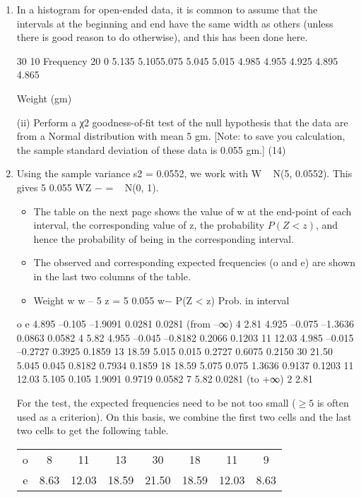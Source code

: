 \documentclass[a4paper,12pt]{article}
\begin{document}
\begin{enumerate} 
\item In a histogram for open-ended data, it is common to assume that the intervals at the beginning and end have the same width as others (unless there is good reason to do otherwise), and this has been done here. 
 
 
 30 
10 
Frequency 
20 
  0 
5.135 5.1055.075 5.045 5.015 4.985 4.955 4.925 4.895 4.865 
 
Weight (gm)  


(ii) Perform a χ2 goodness-of-fit test of the null hypothesis that the data are from a Normal distribution with mean 5 gm.  [Note:  to save you calculation, the sample standard deviation of these data is 0.055 gm.] (14) 
  
 
\item  Using the sample variance s2 = 0.0552, we work with W ~ N(5, 0.0552).  This gives 5 0.055 WZ − = ~ N(0, 1). 

\begin{itemize}
\item The table on the next page shows the value of w at the end-point of each interval, the corresponding value of z, the probability $P(Z < z)$, and hence the probability of being in the corresponding interval.  
\item The observed and corresponding expected frequencies (o and e) are shown in the last two columns of the table. 
\item 
Weight w w – 5 z = 5 0.055 w− P(Z < z) Prob. in interval
\end{itemize}
 o e 
4.895 –0.105 –1.9091 0.0281 0.0281 (from –∞)   4   2.81 4.925 –0.075 –1.3636 0.0863 0.0582    4   5.82 4.955 –0.045 –0.8182 0.2066 0.1203  11 12.03 4.985 –0.015 –0.2727 0.3925 0.1859  13 18.59 5.015   0.015   0.2727 0.6075 0.2150  30 21.50 5.045   0.045   0.8182 0.7934 0.1859  18 18.59 5.075   0.075   1.3636 0.9137 0.1203  11 12.03 5.105   0.105   1.9091 0.9719 0.0582    7   5.82     0.0281 (to +∞)   2   2.81 
 
 
For the test, the expected frequencies need to be not too small ($\geq 5$ is often used as a criterion).  On this basis, we combine the first two cells and the last two cells to get the following table. 
 
\begin{center}
\begin{tabular}{|c|c|c|c|c|c|c|c|} 
o & 8 & 11 & 13 & 30&  18&  11&  9\\ 
e & 8.63&  12.03&  18.59 & 21.50& 18.59 & 12.03 & 8.63\\
\end{tabular}
\end{center}
 

\end{enumerate}
\end{document}
